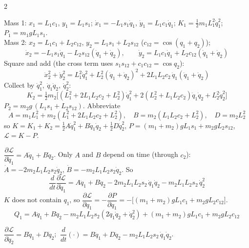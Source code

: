 \begin{multicols}{2}
\begin{deriv}
Mass 1: $x_1=L_1c_1$, $y_1=L_1s_1$; $\dot x_1=-L_1s_1\dot q_1$, $\dot y_1=L_1c_1\dot q_1$; $K_1=\tfrac12m_1L_1^2\dot q_1^2$; $P_1=m_1gL_1s_1$.\\
Mass 2: $x_2=L_1c_1+L_2c_{12}$, $y_2=L_1s_1+L_2s_{12}$ ($c_{12}=\cos(q_1+q_2)$);
\[\dot x_2=-L_1s_1\dot q_1-L_2s_{12}(\dot q_1+\dot q_2),\qquad \dot y_2=L_1c_1\dot q_1+L_2c_{12}(\dot q_1+\dot q_2)\]
Square and add (the cross term uses $s_1s_{12}+c_1c_{12}=\cos q_2$):
\[\dot x_2^2+\dot y_2^2=L_1^2\dot q_1^2+L_2^2(\dot q_1+\dot q_2)^2+2L_1L_2c_2\,\dot q_1(\dot q_1+\dot q_2)\]
Collect by $\dot q_1^2,\ \dot q_1\dot q_2,\ \dot q_2^2$:
\[K_2=\tfrac12m_2\big[(L_1^2+2L_1L_2c_2+L_2^2)\dot q_1^2+2(L_2^2+L_1L_2c_2)\dot q_1\dot q_2+L_2^2\dot q_2^2\big]\]
$P_2=m_2g\,(L_1s_1+L_2s_{12})$. Abbreviate
\[A=m_1L_1^2+m_2(L_1^2+2L_1L_2c_2+L_2^2),\quad B=m_2(L_1L_2c_2+L_2^2),\quad D=m_2L_2^2\]
so $K=K_1+K_2=\tfrac12A\dot q_1^2+B\dot q_1\dot q_2+\tfrac12D\dot q_2^2$, $P=(m_1+m_2)gL_1s_1+m_2gL_2s_{12}$, $\mathcal L=K-P$.
\end{deriv}
\begin{deriv}
$\dfrac{\partial\mathcal L}{\partial\dot q_1}=A\dot q_1+B\dot q_2$. Only $A$ and $B$ depend on time (through $c_2$): $\dot A=-2m_2L_1L_2s_2\dot q_2$, $\dot B=-m_2L_1L_2s_2\dot q_2$. So
\[\frac d{dt}\frac{\partial\mathcal L}{\partial\dot q_1}=A\ddot q_1+B\ddot q_2-2m_2L_1L_2s_2\,\dot q_1\dot q_2-m_2L_1L_2s_2\,\dot q_2^2\]
$K$ does not contain $q_1$, so $\dfrac{\partial\mathcal L}{\partial q_1}=-\dfrac{\partial P}{\partial q_1}=-\big[(m_1+m_2)gL_1c_1+m_2gL_2c_{12}\big]$.
\[Q_1=A\ddot q_1+B\ddot q_2-m_2L_1L_2s_2(2\dot q_1\dot q_2+\dot q_2^2)+(m_1+m_2)gL_1c_1+m_2gL_2c_{12}\]
\end{deriv}
\begin{deriv}
$\dfrac{\partial\mathcal L}{\partial\dot q_2}=B\dot q_1+D\dot q_2$; $\ \dfrac d{dt}(\cdot)=B\ddot q_1+D\ddot q_2-m_2L_1L_2s_2\,\dot q_1\dot q_2$.\\

\end{deriv}
\end{multicols}
